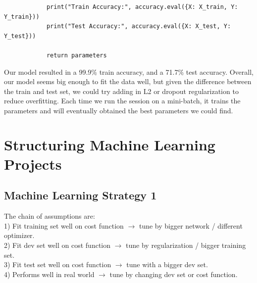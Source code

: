 \documentclass[11pt, a4paper]{article}
\begin{document}
\begin{spacing}{1.1}
\begin{lstlisting}
			print("Train Accuracy:", accuracy.eval({X: X_train, Y: Y_train}))
			print("Test Accuracy:", accuracy.eval({X: X_test, Y: Y_test}))
			
			return parameters \end{lstlisting} \vspace*{1mm} 
	Our model resulted in a 99.9\% train accuracy, and a 71.7\% test accuracy. Overall, our model seems big enough to fit the data well, but given the difference between the train and test set, we could try adding in L2 or dropout regularization to reduce overfitting. Each time we run the session on a mini-batch, it trains the parameters and will eventually obtained the best parameters we could find. \newpage

	\section{Structuring Machine Learning Projects}
	\subsection{Machine Learning Strategy 1}
	The chain of assumptions are: \vspace*{.5mm} \\
	\hspace*{3mm} 1) Fit training set well on cost function $\rightarrow$ tune by bigger network / different optimizer. \\
	\hspace*{3mm} 2) Fit dev set well on cost function $\rightarrow$ tune by regularization / bigger training set. \\
	\hspace*{3mm} 3) Fit test set well on cost function $\rightarrow$ tune with a bigger dev set. \\
	\hspace*{3mm} 4) Performs well in real world $\rightarrow$ tune by changing dev set or cost function.

\end{spacing}
\end{document}
